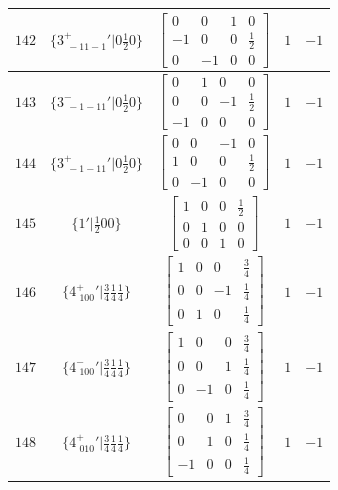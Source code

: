 \documentclass[fleqn,8pt]{jsarticle}
\begin{document}
\begin{longtable}{ccccc}
$ 142 $ & $ \{3^{+}_{\,\,-11-1}{}'|0 \frac{1}{2} 0\} $ & $ \begin{bmatrix} 0 & 0 & 1 & 0 \\ -1 & 0 & 0 & \frac{1}{2} \\ 0 & -1 & 0 & 0 \end{bmatrix} $ & $ 1 $ & $ -1 $ \\ \hline
$ 143 $ & $ \{3^{-}_{\,\,-1-11}{}'|0 \frac{1}{2} 0\} $ & $ \begin{bmatrix} 0 & 1 & 0 & 0 \\ 0 & 0 & -1 & \frac{1}{2} \\ -1 & 0 & 0 & 0 \end{bmatrix} $ & $ 1 $ & $ -1 $ \\ \hline
$ 144 $ & $ \{3^{+}_{\,\,-1-11}{}'|0 \frac{1}{2} 0\} $ & $ \begin{bmatrix} 0 & 0 & -1 & 0 \\ 1 & 0 & 0 & \frac{1}{2} \\ 0 & -1 & 0 & 0 \end{bmatrix} $ & $ 1 $ & $ -1 $ \\ \hline
$ 145 $ & $ \{1{}'|\frac{1}{2} 0 0\} $ & $ \begin{bmatrix} 1 & 0 & 0 & \frac{1}{2} \\ 0 & 1 & 0 & 0 \\ 0 & 0 & 1 & 0 \end{bmatrix} $ & $ 1 $ & $ -1 $ \\ \hline
$ 146 $ & $ \{4^{+}_{\,\,100}{}'|\frac{3}{4} \frac{1}{4} \frac{1}{4}\} $ & $ \begin{bmatrix} 1 & 0 & 0 & \frac{3}{4} \\ 0 & 0 & -1 & \frac{1}{4} \\ 0 & 1 & 0 & \frac{1}{4} \end{bmatrix} $ & $ 1 $ & $ -1 $ \\ \hline
$ 147 $ & $ \{4^{-}_{\,\,100}{}'|\frac{3}{4} \frac{1}{4} \frac{1}{4}\} $ & $ \begin{bmatrix} 1 & 0 & 0 & \frac{3}{4} \\ 0 & 0 & 1 & \frac{1}{4} \\ 0 & -1 & 0 & \frac{1}{4} \end{bmatrix} $ & $ 1 $ & $ -1 $ \\ \hline
$ 148 $ & $ \{4^{+}_{\,\,010}{}'|\frac{3}{4} \frac{1}{4} \frac{1}{4}\} $ & $ \begin{bmatrix} 0 & 0 & 1 & \frac{3}{4} \\ 0 & 1 & 0 & \frac{1}{4} \\ -1 & 0 & 0 & \frac{1}{4} \end{bmatrix} $ & $ 1 $ & $ -1 $ \\ \hline

\end{longtable}
\end{document}
